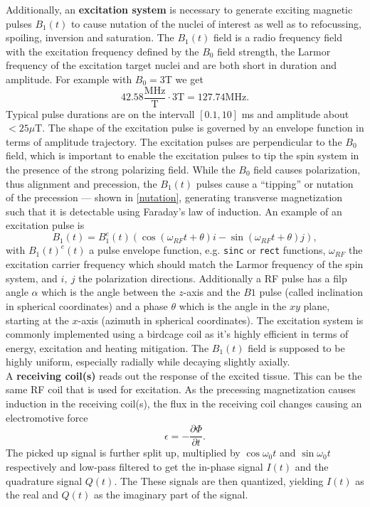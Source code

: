 Additionally, an \textbf{excitation system} is necessary to generate exciting magnetic pulses $B_1(t)$ to cause nutation of the nuclei of interest as well as to refocussing, spoiling, inversion and saturation.
The $B_1(t)$ field is a radio frequency field with the excitation frequency defined by the $B_0$ field strength, the Larmor frequency of the excitation target nuclei and are both short in duration and amplitude.
For example with $B_0 = 3$T we get
\[ 42.58 \frac{\text{MHz}}{\text{T}} \cdot 3 \text{T} = 127.74 \text{MHz}. \]
Typical pulse durations are on the intervall $[0.1, 10]$ ms and amplitude about $< 25 \mu \text{T}$.
The shape of the excitation pulse is governed by an envelope function in terms of amplitude trajectory.
The excitation pulses are perpendicular to the $B_0$ field, which is important to enable the excitation pulses to tip the spin system in the presence of the strong polarizing field.
While the $B_0$ field causes polarization, thus alignment and precession, the $B_1(t)$ pulses cause a ``tipping'' or nutation of the precession --- shown in \ref{nutation}, generating transverse magnetization such that it is detectable using Faraday's law of induction.
An example of an excitation pulse is
\[ B_1(t) = B_1^e (t) \left(\cos\left(\omega_{RF} t + \theta \right) i - \sin\left(\omega_{RF} t + \theta \right) j \right), \]
with $B_1(t)^e (t)$ a pulse envelope function, e.g. \texttt{sinc} or \texttt{rect} functions, $\omega_{RF}$ the excitation carrier frequency which should match the Larmor frequency of the spin system, and $i, \ j$ the polarization directions.
Additionally a RF pulse has a filp angle $\alpha$ which is the angle between the $z$-axis and the $B1$ pulse (called inclination in spherical coordinates) and a phase $\theta$ which is the angle in the $xy$ plane, starting at the $x$-axis (azimuth in spherical coordinates).
The excitation system is commonly implemented using a birdcage coil as it's highly efficient in terms of energy, excitation and  heating mitigation.
The $B_1(t)$ field is supposed to be highly uniform, especially radially while decaying slightly axially. \\

A \textbf{receiving coil(s)} reads out the response of the excited tissue.
This can be the same RF coil that is used for excitation.
As the precessing magnetization causes induction in the receiving coil(s), the flux in the receiving coil changes causing an electromotive force
\[ \epsilon = - \frac{\partial \Phi}{\partial t}. \]
The picked up signal is further split up, multiplied by $\cos{\omega_0 t}$ and $\sin{\omega_0 t}$ respectively and low-pass filtered to get the in-phase signal $I(t)$ and the quadrature signal $Q(t)$.
The These signals are then quantized, yielding $I(t)$ as the real and $Q(t)$ as the imaginary part of the signal.

